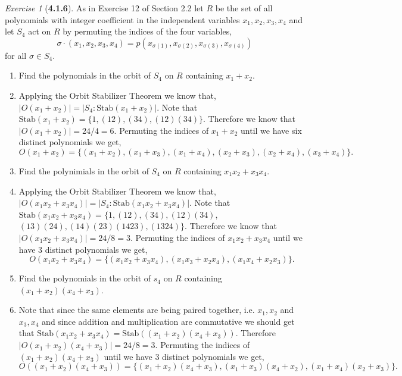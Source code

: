 \documentclass[12pt]{amsart}
\makeatletter
\theoremstyle{remark}
\newtheorem*{exercise}{Exercise}%
\renewenvironment{proof}[1][\proofname]{\par\doublespacing
  \pushQED{\qed}%
  \normalfont \topsep6\p@\@plus6\p@\relax
  \list{}{%
    \settowidth{\leftmargin}{\itshape\proofname:\hskip\labelsep}%
    \setlength{\labelwidth}{0pt}%
    \setlength{\itemindent}{-\leftmargin}%
  }%
  \item[\hskip\labelsep\itshape#1\@addpunct{:}]\ignorespaces
}{%
  \popQED\endlist\@endpefalse
  \singlespacing
}
\theoremstyle{mycomment}
\makeatother
\begin{document}
\begin{exercise}[\textbf{4.1.6}] As in Exercise 12 of Section 2.2 let $R$ be the set of all polynomials with 
  integer coefficient in the independent variables $x_1, x_2, x_3, x_4$ and let $S_4$ act on $R$ by permuting 
  the indices of the four variables, 
  \begin{equation*}
    \sigma \cdot (x_1, x_2, x_3, x_4) = p(x_{\sigma(1)}, x_{\sigma(2)}, x_{\sigma(3)}, x_{\sigma(4)})
  \end{equation*}
  for all $\sigma \in S_4$.
  \begin{enumerate}
    \item[a.] Find the polynomials in the orbit of $S_4$ on $R$ containing $x_1 + x_2$.\\
    \begin{proof}[Solution] Applying the Orbit Stabilizer Theorem we know that, $|O(x_1 + x_2)| = |S_4:\text{Stab}(x_1 + x_2)|$. 
      Note that $\text{Stab}(x_1 + x_2) = \{1, (1 2), (3 4), (1 2)(3 4)\}$. Therefore we know that $|O(x_1 + x_2)| = 24/4 = 6$.
      Permuting the indices of $x_1 + x_2$ until we have six distinct polynomials we get, 
      \begin{equation*}
        O(x_1 + x_2) = \{(x_1 + x_2), (x_1 + x_3), (x_1 + x_4), (x_2 + x_3), (x_2 + x_4), (x_3 + x_4)\}.
      \end{equation*}
      
    \end{proof}
    \item[b.] Find the polynimials in the orbit of $S_4$ on $R$ containing $x_1x_2 + x_3x_4$. 
    \begin{proof}[Solution] Applying the Orbit Stabilizer Theorem we know that, $|O(x_1x_2 + x_3x_4)| = |S_4:\text{Stab}(x_1x_2 + x_3x_4)|$. 
      Note that $\text{Stab}(x_1x_2 + x_3x_4) = \{1, (1 2), (3 4), (1 2)(3 4)$, 
      $(1 3)(2 4), (1 4)(2 3) (1 4 2 3), ( 1 3 2 4)\}$. Therefore we know that $|O(x_1x_2 + x_3x_4)| = 24/8 = 3$.
      Permuting the indices of $x_1x_2 + x_3x_4$ until we have 3 distinct polynomials we get, 
      \begin{equation*}
        O(x_1x_2 + x_3x_4) = \{(x_1x_2 + x_3x_4), (x_1x_3 + x_2x_4), (x_1x_4 + x_2x_3)\}.
      \end{equation*}
    \end{proof}
    \item[c.] Find the polynomials in the orbit of $s_4$ on $R$ containing $(x_1 + x_2)(x_4 + x_3)$. 
  \begin{proof}[Solution] Note that since the same elements are being paired together, i.e. $x_1, x_2$ and $x_3,x_4$ and since addition and multiplication are commutative we should get that $\text{Stab}(x_1x_2 + x_3x_4) = \text{Stab}((x_1 + x_2)(x_4 + x_3))$. Therefore $|O(x_1 + x_2)(x_4 + x_3)| = 24/8 = 3$.
    Permuting the indices of $(x_1 + x_2)(x_4 + x_3)$ until we have 3 distinct polynomials we get, 
    \begin{equation*}
      O((x_1 + x_2)(x_4 + x_3)) = \{(x_1 + x_2)(x_4 + x_3), (x_1 + x_3)(x_4 + x_2), (x_1 + x_4)(x_2 + x_3)\}.
    \end{equation*}
  \end{proof}
\end{enumerate}
\end{exercise}
\end{document}
